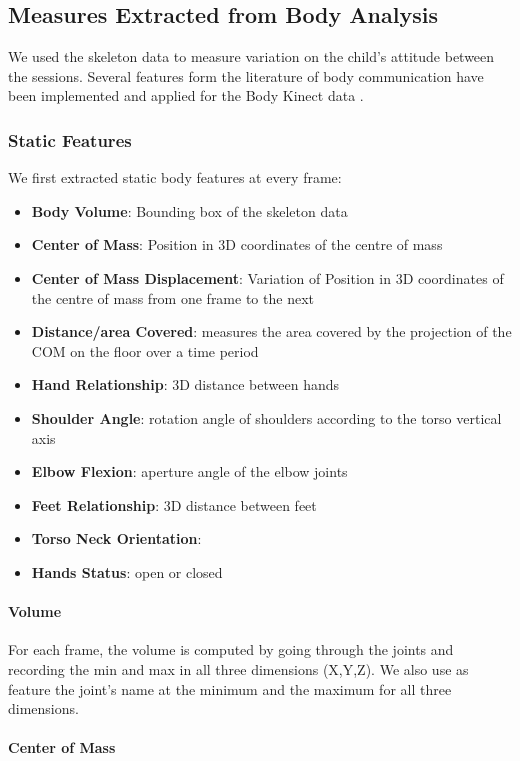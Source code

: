 \documentclass[a4paper,twocolumn]{svjour3}
\begin{document}
\subsection{Measures Extracted from Body Analysis}
We used the skeleton data to measure variation on the child's attitude between the sessions.
Several features form the literature of body communication have been implemented and applied for the Body Kinect data \cite{larboulette2015review}.

\subsubsection{Static Features}
We first extracted static body features at every frame:
\begin{itemize}[noitemsep,nolistsep]
\item \textbf{Body Volume}: Bounding box of the skeleton data
\item \textbf{Center of Mass}: Position in 3D coordinates of the centre of mass 
\item \textbf{Center of Mass Displacement}: Variation of Position in 3D coordinates of the centre of mass from one frame to the next
\item \textbf{Distance/area Covered}: measures the area covered by the projection of the COM on the floor over a time period
\item \textbf{Hand Relationship}: 3D distance between hands
\item \textbf{Shoulder Angle}: rotation angle of shoulders according to the torso vertical axis
\item \textbf{Elbow Flexion}: aperture angle of the elbow joints
\item \textbf{Feet Relationship}: 3D distance between feet
\item \textbf{Torso Neck Orientation}: %
\item \textbf{Hands Status}: open or closed 
\end{itemize}

\paragraph{Volume}
For each frame, the volume is computed by going through the joints and recording the min and max in all three dimensions (X,Y,Z). 
We also use as feature the joint's name at the minimum and the maximum for all three dimensions.

\paragraph{Center of Mass}
\end{document}
